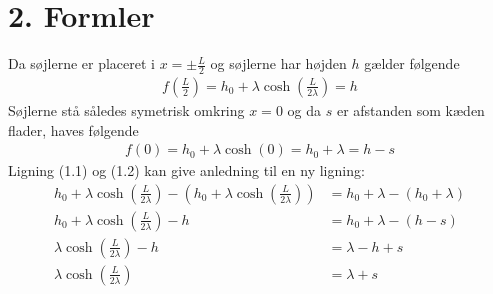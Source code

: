 \section*{2. Formler}
Da søjlerne er placeret i $x = \pm \frac{L}{2}$ og søjlerne har højden $h$ gælder følgende
\begin{align}
f\left(\frac{L}{2}\right)	= h_0 + \lambda \cosh \left(\frac{L}{2 \lambda}\right) = h
\end{align}
Søjlerne stå således symetrisk omkring $x = 0$ og da $s$ er afstanden som kæden flader, haves følgende
\begin{align}
f(0) =	 h_0 + \lambda 	\cosh (0)	= h_0 + \lambda = h-s
\end{align}
%
Ligning (1.1) og (1.2) kan give anledning til en ny ligning:
%
\begin{align}
h_0 + \lambda \cosh \left(\frac{L}{2 \lambda}\right) -\left(h_0 + \lambda \cosh \left(\frac{L}{2 \lambda}\right)\right) &= h_0 + \lambda -(h_0 + \lambda)\\
h_0 + \lambda \cosh \left(\frac{L}{2 \lambda}\right) - h &= h_0 + \lambda - (h - s)\\
\lambda \cosh \left(\frac{L}{2 \lambda}\right) - h &= \lambda - h + s\\
\lambda \cosh \left(\frac{L}{2 \lambda}\right) &= \lambda + s
\end{align}